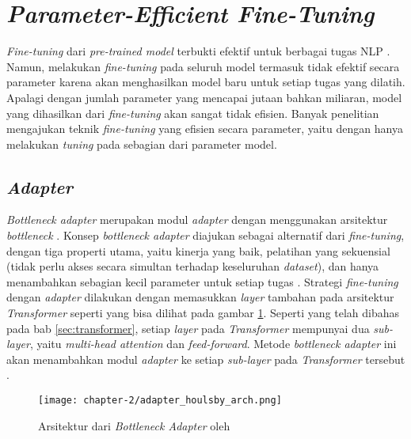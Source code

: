 \section{\textit{Parameter-Efficient Fine-Tuning}}
\label{sec:peft}

\textit{Fine-tuning} dari \textit{pre-trained model} terbukti efektif untuk berbagai tugas NLP \parencite{fine_tuning}. Namun, melakukan \textit{fine-tuning} pada seluruh model termasuk tidak efektif secara parameter karena akan menghasilkan model baru untuk setiap tugas yang dilatih. Apalagi dengan jumlah parameter yang mencapai jutaan bahkan miliaran, model yang dihasilkan dari \textit{fine-tuning} akan sangat tidak efisien. Banyak penelitian mengajukan teknik \textit{fine-tuning} yang efisien secara parameter, yaitu \PEFT dengan hanya melakukan \textit{tuning} pada sebagian dari parameter model.

\subsection{\textit{Adapter}}

\textit{Bottleneck adapter} merupakan modul \textit{adapter} dengan menggunakan arsitektur \textit{bottleneck} \parencite{adapter_houlsby}. Konsep \textit{bottleneck adapter} diajukan sebagai alternatif dari \textit{fine-tuning}, dengan tiga properti utama, yaitu kinerja yang baik, pelatihan yang sekuensial (tidak perlu akses secara simultan terhadap keseluruhan \textit{dataset}), dan hanya menambahkan sebagian kecil parameter untuk setiap tugas \parencite{adapter_houlsby}. Strategi \textit{fine-tuning} dengan \textit{adapter} dilakukan dengan memasukkan \textit{layer} tambahan pada arsitektur \textit{Transformer} seperti yang bisa dilihat pada gambar \ref{fig:adapters_houlsby_arch}. Seperti yang telah dibahas pada bab \ref{sec:transformer}, setiap \textit{layer} pada \textit{Transformer} mempunyai dua \textit{sub-layer}, yaitu \textit{multi-head attention} dan \textit{feed-forward}. Metode \textit{bottleneck adapter} ini akan menambahkan modul \textit{adapter} ke setiap \textit{sub-layer} pada \textit{Transformer} tersebut \parencite{adapter_houlsby}.

\begin{figure}[h]
    \vspace{0.25cm}
    \centering
    \texttt{[image: chapter-2/adapter\_houlsby\_arch.png]}
    \caption{Arsitektur dari \textit{Bottleneck Adapter} oleh \citeauthor{adapter_houlsby} \parencite{adapter_houlsby}}
    \label{fig:adapters_houlsby_arch}
\end{figure}

